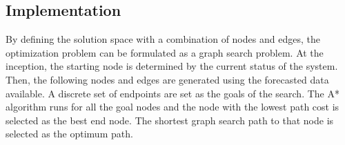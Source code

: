 





\subsection{Implementation}
By defining the solution space with a combination of nodes and edges, the optimization problem can be formulated as a graph search problem. At the inception, the starting node is determined by the current status of the system. Then, the following nodes and edges are generated using the forecasted data available. A discrete set of endpoints are set as the goals of the search. The A*  algorithm runs for all the goal nodes and the node with the lowest path cost is selected as the best end node. The shortest graph search path to that node is selected as the optimum path.

